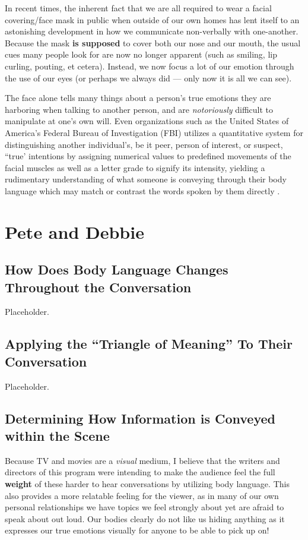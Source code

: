 \documentclass[stu,12pt]{apa7}
\begin{document}
      In recent times, the inherent fact that we are all required to wear a
        facial covering/face mask in public when outside of our own homes has
        lent itself to an astonishing development in how we communicate
        non-verbally with one-another. Because the mask \textbf{is supposed}
        to cover both our nose and our mouth, the usual cues many people look
        for are now no longer apparent (such as smiling, lip curling, pouting,
        et cetera). Instead, we now focus a lot of our emotion through the use
        of our eyes (or perhaps we always did --- only now it is all we can
        see).

      The face alone tells many things about a person's true emotions they are
        harboring when talking to another person, and are \textit{notoriously}
        difficult to manipulate at one's own will. Even organizations such as
        the United States of America's Federal Bureau of Investigation (FBI)
        utilizes a quantitative system for distinguishing another individual's,
        be it peer, person of interest, or suspect, ``true' intentions by
        assigning numerical values to predefined movements of the facial muscles
        as well as a letter grade to signify its intensity, yielding a
        rudimentary understanding of what someone is conveying through their
        body language which may match or contrast the words spoken by them
        directly \parencite[pp. 209]{cohn_observer-based_2007}.


  \section{Pete and Debbie}
    \subsection{How Does Body Language Changes Throughout the Conversation}
      Placeholder.

    \subsection{Applying the ``Triangle of Meaning'' To Their Conversation}
      Placeholder.

    \subsection{Determining How Information is Conveyed within the Scene}
      Because TV and movies are a \textit{visual} medium, I believe that the
        writers and directors of this program were intending to make the
        audience feel the full \textbf{weight} of these harder to hear
        conversations by utilizing body language. This also provides a more
        relatable feeling for the viewer, as in many of our own personal
        relationships we have topics we feel strongly about yet are afraid to
        speak about out loud. Our bodies clearly do not like us hiding anything
        as it expresses our true emotions visually for anyone to be able to
        pick up on!
\end{document}
